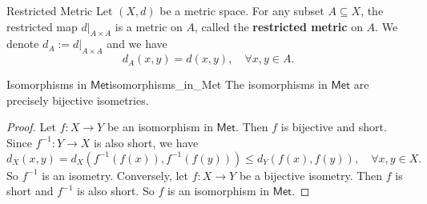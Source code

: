 \documentclass{report}
\begin{document}
\begin{definition}{Restricted Metric}
	Let $(X,d)$ be a metric space. For any subset $A\subseteq X$, the restricted map $d|_{A\times A}$ is a metric on $A$, called the \textbf{restricted metric} on $A$. We denote $d_A:=d|_{A\times A}$ and we have
	\[
		d_A(x,y)=d(x,y),\quad\forall x,y\in A.
	\]
\end{definition}


\begin{proposition}{Isomorphisms in $\mathsf{Met}$}{isomorphisms_in_Met}
	The isomorphisms in $\mathsf{Met}$ are precisely bijective isometries.
\end{proposition}
\begin{proof}
	Let $f:X\to Y$ be an isomorphism in $\mathsf{Met}$. Then $f$ is bijective and short. Since $f^{-1}:Y\to X$ is also short, we have
	\[
		d_X(x,y)=d_X(f^{-1}(f(x)),f^{-1}(f(y)))\le d_Y(f(x),f(y)),\quad\forall x,y\in X.
	\]
	So $f^{-1}$ is an isometry. Conversely, let $f:X\to Y$ be a bijective isometry. Then $f$ is short and $f^{-1}$ is also short. So $f$ is an isomorphism in $\mathsf{Met}$.
\end{proof}
\end{document}
